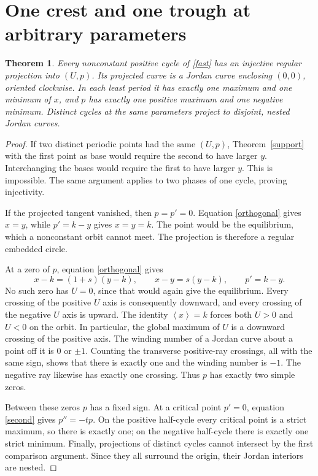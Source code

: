 \documentclass[11pt,a4paper]{article}
\newtheorem{theorem}{Theorem}[section]\newtheorem{lemma}[theorem]{Lemma}
\theoremstyle{remark}\newtheorem{remark}[theorem]{Remark}
\newcommand{\av}[1]{\left\langle #1\right\rangle}
\begin{document}
\section{One crest and one trough at arbitrary parameters}
\begin{theorem}\label{onecrest}
Every nonconstant positive cycle of \eqref{fast} has an injective regular projection into $(U,p)$. Its projected curve is a Jordan curve enclosing $(0,0)$, oriented clockwise. In each least period it has exactly one maximum and one minimum of $x$, and $p$ has exactly one positive maximum and one negative minimum. Distinct cycles at the same parameters project to disjoint, nested Jordan curves.
\end{theorem}
\begin{proof}
If two distinct periodic points had the same $(U,p)$, Theorem~\ref{support} with the first point as base would require the second to have larger $y$. Interchanging the bases would require the first to have larger $y$. This is impossible. The same argument applies to two phases of one cycle, proving injectivity.

If the projected tangent vanished, then $p=p'=0$. Equation \eqref{orthogonal} gives $x=y$, while $p'=k-y$ gives $x=y=k$. The point would be the equilibrium, which a nonconstant orbit cannot meet. The projection is therefore a regular embedded circle.

At a zero of $p$, equation \eqref{orthogonal} gives
\begin{equation}\label{crest}
 x-k=(1+s)(y-k),\qquad x-y=s(y-k),\qquad p'=k-y.
\end{equation}
No such zero has $U=0$, since that would again give the equilibrium. Every crossing of the positive $U$ axis is consequently downward, and every crossing of the negative $U$ axis is upward. The identity $\av{x}=k$ forces both $U>0$ and $U<0$ on the orbit. In particular, the global maximum of $U$ is a downward crossing of the positive axis. The winding number of a Jordan curve about a point off it is $0$ or $\pm1$. Counting the transverse positive-ray crossings, all with the same sign, shows that there is exactly one and the winding number is $-1$. The negative ray likewise has exactly one crossing. Thus $p$ has exactly two simple zeros.

Between these zeros $p$ has a fixed sign. At a critical point $p'=0$, equation \eqref{second} gives $p''=-tp$. On the positive half-cycle every critical point is a strict maximum, so there is exactly one; on the negative half-cycle there is exactly one strict minimum. Finally, projections of distinct cycles cannot intersect by the first comparison argument. Since they all surround the origin, their Jordan interiors are nested.
\end{proof}
\end{document}
